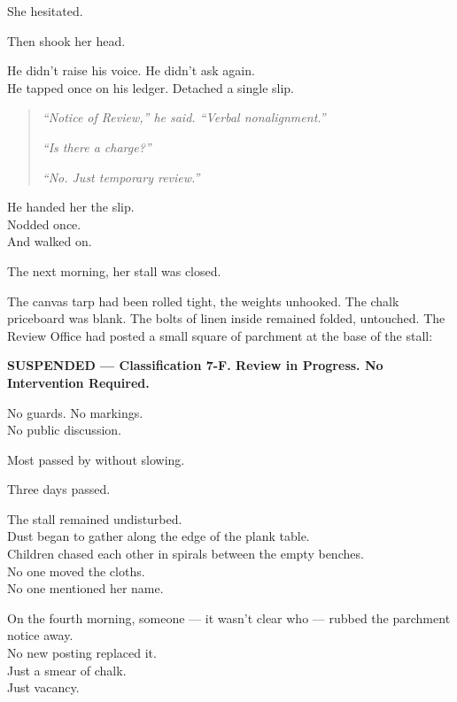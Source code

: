 \documentclass[9pt]{article}
\begin{document}
She hesitated.

Then shook her head.

He didn’t raise his voice. He didn’t ask again.\\
He tapped once on his ledger. Detached a single slip.

\begin{quote}
\textit{“Notice of Review,” he said. “Verbal nonalignment.”}

\textit{“Is there a charge?”}

\textit{“No. Just temporary review.”}
\end{quote}

He handed her the slip.\\
Nodded once.\\
And walked on.

\vspace{1em}

The next morning, her stall was closed.

The canvas tarp had been rolled tight, the weights unhooked. The chalk priceboard was blank. The bolts of linen inside remained folded, untouched. The Review Office had posted a small square of parchment at the base of the stall:

\begin{center}
\textbf{SUSPENDED --- Classification 7-F. Review in Progress. No Intervention Required.}
\end{center}

No guards. No markings.\\
No public discussion.

Most passed by without slowing.

\vspace{1em}

Three days passed.

The stall remained undisturbed.\\
Dust began to gather along the edge of the plank table.\\
Children chased each other in spirals between the empty benches.\\
No one moved the cloths.\\
No one mentioned her name.

On the fourth morning, someone --- it wasn’t clear who --- rubbed the parchment notice away.\\
No new posting replaced it.\\
Just a smear of chalk.\\
Just vacancy.
\end{document}
